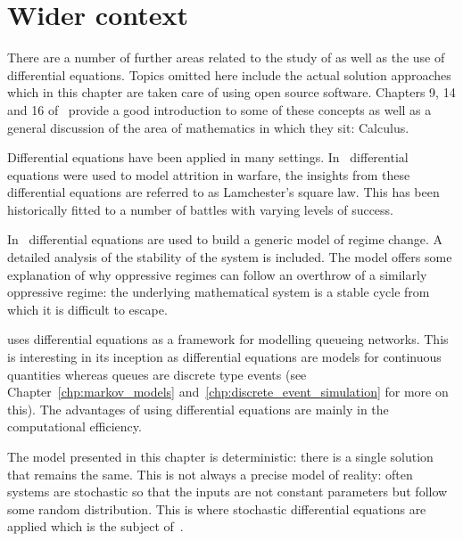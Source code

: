 \section{Wider context}\label{sec:differential_equations_wider_context}

There are a number of further areas related to the study of as well as the use
of differential equations. Topics omitted here include the actual solution
approaches which in this chapter are taken
care of using open source software. Chapters 9, 14 and 16
of~\parencite{stewart2009calculus} provide a good introduction to some of
these concepts as well as a general discussion of the area of mathematics in
which they sit: Calculus.

Differential equations have been applied in many settings.
In~\parencite{lanchester1916aircraft} differential equations were used to model
attrition in warfare, the insights from these differential equations are
referred to as Lamchester's square law. This has been historically fitted to a
number of battles with varying levels of success.

In~\parencite{syms2015dynamic} differential equations are used to build a
generic model of regime change. A detailed analysis of the stability of the
system is included. The model offers some explanation of why oppressive regimes
can follow an overthrow of a similarly oppressive regime: the underlying
mathematical system is a stable cycle from which it is difficult to escape.

\parencite{vandergraft1983fluid} uses differential equations as a framework for
modelling queueing networks. This is interesting in its inception as
differential equations are models for continuous quantities whereas queues are
discrete type events (see Chapter~\ref{chp:markov_models}
and~\ref{chp:discrete_event_simulation} for more on this). The advantages of
using differential equations are mainly in the computational efficiency.

The model presented in this chapter is deterministic: there is a single solution
that remains the same. This is not always a precise model of reality: often
systems are stochastic so that the inputs are not constant parameters but follow
some random distribution. This is where stochastic differential equations are
applied which is the subject of~\parencite{sarkka2019applied}.
